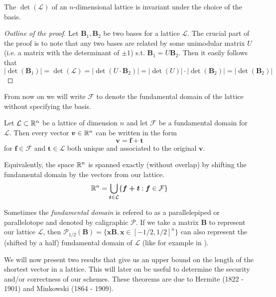 \begin{lemma}
    The $\det (\mathcal{L})$ of an $n$-dimensional lattice is invariant under the choice of the basis.
\end{lemma}

\begin{proof}[Outline of the proof]
    Let $\bm{B}_1, \bm{B}_2$ be two bases for a lattice $\mathcal{L}$. The crucial part of the proof is to note that any two bases are related by some unimodular matrix $U$ (i.e. a matrix with the determinant of $\pm 1$) s.t. $\bm{B}_1 = U \bm{B}_2$. Then it easily follows that 
	\[| \det (\bm{B}_1) | = \det (\mathcal{L}) = | \det (U \cdot \bm{B}_2) | = | \det(U) | \cdot | \det(\bm{B}_2) | = | \det(\bm{B}_2)| \]
\end{proof}

From now on we will write $\mathcal{F}$ to denote the fundamental domain of the lattice without specifying the basis.

\begin{proposition}
    Let $\mathcal{L} \subset \mathbb{R}^n$ be a lattice of dimension $n$ and let $\mathcal{F}$ be a fundamental domain for $\mathcal{L}$. Then every vector $\boldsymbol{v} \in \mathbb{R}^n$ can be written in the form 
    $$\bm{v} = \bm{f} + \bm{t}$$
    for $\bm{f} \in \mathcal{F}$ and $\bm{t} \in \mathcal{L}$ both unique and associated to the original $\bm{v}$.
\end{proposition}

Equivalently, the space $\mathbb{R}^n$ is spanned exactly (without overlap) by shifting the fundamental domain by the vectors from our lattice.
$$ \mathbb{R}^n = \bigcup_{\boldsymbol{t} \in \mathcal{L}} \{\boldsymbol{f + t} : \boldsymbol{f} \in \mathcal{F} \}$$

\begin{remark}
    Sometimes the \textit{fundamental domain} is refered to as a parallelepiped or parallelotope and denoted by caligraphic $\mathcal{P}$. If we take a matrix $\bm{B}$ to represent our lattice $\mathcal{L}$, then $\mathcal{P}_{1/2}(\bm{B}) = \{\bm{x}\bm{B}, \bm{x} \in [-1/2, 1/2]^n \}$ can also represent the (shifted by a half) fundamental domain of $\mathcal{L}$ (like for example in \cite{gentry}).
\end{remark}
\iffalse
We will now present two results that give us an upper bound on the length of the shortest vector in a lattice. This will later on be useful to determine the security and/or correctness of our schemes. These theorems are due to Hermite (1822 - 1901) and Minkowski (1864 - 1909).

